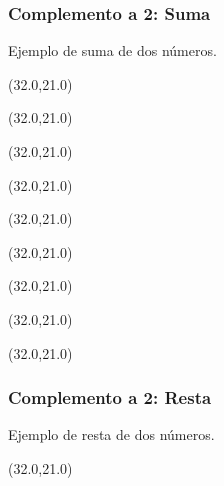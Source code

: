 \documentclass[aspectratio=169]{beamer}
\begin{document}
\begin{frame}[fragile,t]
    \frametitle{\textbf{Complemento a 2}: Suma}
    Ejemplo de suma de dos números.
    \begin{textblock}{20}(32.0,21.0)  \end{textblock} %
    \begin{textblock}{20}(32.0,21.0)  \end{textblock}
    \begin{textblock}{20}(32.0,21.0)  \end{textblock}
    \begin{textblock}{20}(32.0,21.0)  \end{textblock}
    \begin{textblock}{20}(32.0,21.0)  \end{textblock}
    \begin{textblock}{20}(32.0,21.0)  \end{textblock}
    \begin{textblock}{20}(32.0,21.0)  \end{textblock}
    \begin{textblock}{20}(32.0,21.0)  \end{textblock}
    \begin{textblock}{20}(32.0,21.0)  \end{textblock}
\end{frame}

\begin{frame}[fragile,t]
    \frametitle{\textbf{Complemento a 2}: Resta}
    Ejemplo de resta de dos números.
    \begin{textblock}{20}(32.0,21.0)  \end{textblock} %
\end{frame}
\end{document}
